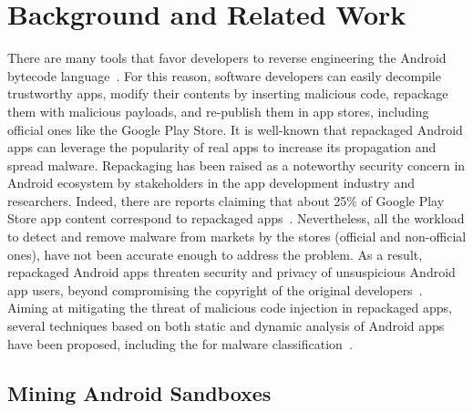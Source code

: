 \section{Background and Related Work}\label{sec:background}


There are many tools that favor developers to reverse engineering the Android bytecode language~\cite{DBLP:conf/issta/WangGMC15}.
For this reason, software developers can easily decompile trustworthy apps, modify their contents by inserting malicious code,
repackage them with malicious payloads, and re-publish them in app stores, including official ones like the Google Play Store.
It is well-known that repackaged Android apps can leverage the popularity of real apps to increase its propagation and spread malware.  
Repackaging has been raised as a noteworthy security concern in Android ecosystem by stakeholders in the app development industry and researchers. Indeed, there are reports claiming that about 25\% of Google Play Store app content correspond to repackaged apps~\cite{DBLP:conf/sigmetrics/ViennotGN14}. Nevertheless, all the workload to detect and remove malware from markets by the stores (official and non-official ones), have not been accurate enough to address the problem. As a result, repackaged Android apps threaten security and privacy of unsuspicious Android app users, beyond compromising the copyright of the original developers~\cite{DBLP:journals/access/KimLCP19}. Aiming at
mitigating the threat of malicious code injection in repackaged apps,
several techniques based on both static and dynamic analysis of Android apps have been proposed,
including the \mas for malware classification~\cite{DBLP:conf/icse/JamrozikSZ16,DBLP:conf/wcre/BaoLL18}. 

\subsection{Mining Android Sandboxes}\label{sec:android-sandbox}

